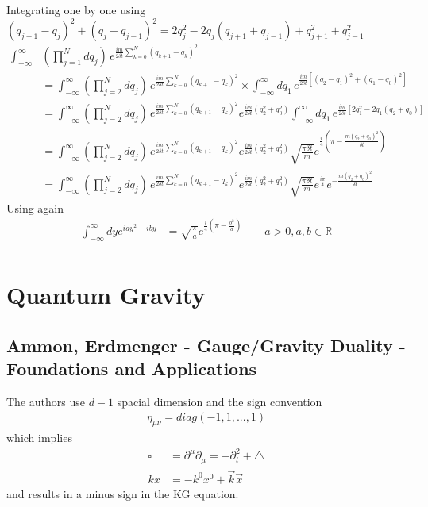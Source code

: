 \documentclass[10pt,a4paper]{article}
\theoremstyle{definition}
\begin{document}
Integrating one by one using $(q_{j+1}-q_j)^2+(q_j-q_{j-1})^2=2q_j^2-2q_j(q_{j+1}+q_{j-1})+q_{j+1}^2+q_{j-1}^2$ 
\begin{align}
    \int_{-\infty}^{\infty}&\left(\prod_{j=1}^N dq_j\right)\,e^{\frac{im}{2\delta t}\sum_{k=0}^N(q_{k+1}-q_k)^2}\\
    &=\int_{-\infty}^{\infty}\left(\prod_{j=2}^N dq_j\right)\,e^{\frac{im}{2\delta t}\sum_{k=0}^N(q_{k+1}-q_k)^2}
    \times\int_{-\infty}^{\infty}dq_1\,e^{\frac{im}{2\delta t}\left[(q_2-q_1)^2+(q_1-q_0)^2\right]}\\
    &=\int_{-\infty}^{\infty}\left(\prod_{j=2}^N dq_j\right)\,e^{\frac{im}{2\delta t}\sum_{k=0}^N(q_{k+1}-q_k)^2}
    e^{\frac{im}{2\delta t}(q_2^2+q_0^2)}\int_{-\infty}^{\infty}dq_1\,e^{\frac{im}{2\delta t}[2q_1^2-2q_1(q_2+q_0)]}\\
    &=\int_{-\infty}^{\infty}\left(\prod_{j=2}^N dq_j\right)\,e^{\frac{im}{2\delta t}\sum_{k=0}^N(q_{k+1}-q_k)^2}
    e^{\frac{im}{2\delta t}(q_2^2+q_0^2)}\sqrt{\frac{\pi\delta t}{m}}e^{\frac{i}{4}\left(\pi-\frac{m(q_2+q_0)^2}{\delta t}\right)}\\
    &=\int_{-\infty}^{\infty}\left(\prod_{j=2}^N dq_j\right)\,e^{\frac{im}{2\delta t}\sum_{k=0}^N(q_{k+1}-q_k)^2}
    e^{\frac{im}{2\delta t}(q_2^2+q_0^2)}\sqrt{\frac{\pi\delta t}{m}}e^{\frac{i\pi}{4}}e^{-\frac{m(q_2+q_0)^2}{\delta t}}
\end{align}
Using again
\begin{align}
    \int_{-\infty}^\infty dy e^{iay^2-iby}&=\sqrt{\frac{\pi}{a}}e^{\frac{i}{4}\left(\pi-\frac{b^2}{a}\right)} \qquad a>0, a,b\in\mathbb{R}\\
\end{align}

\newpage
\section{Quantum Gravity}
\subsection{{\sc Ammon, Erdmenger} - Gauge/Gravity Duality - Foundations and Applications}
The authors use $d-1$ spacial dimension and the sign convention 
\begin{align}
\eta_{\mu\nu}=diag(-1,1,...,1)
\end{align}
which implies 
\begin{align}
    \square&=\partial^\mu\partial_\mu=-\partial_t^2+\triangle\\
    kx&=-k^0x^0+\vec{k}\vec{x}
\end{align}
and results in a minus sign in the KG equation.
\end{document}
